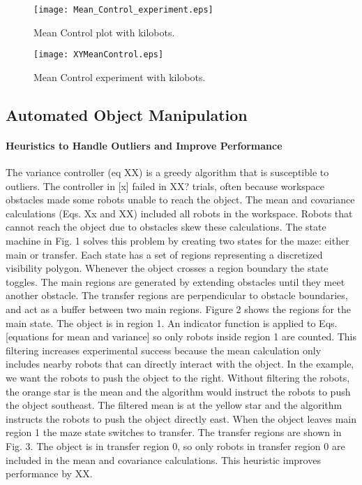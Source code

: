 \begin{figure}
\begin{center}
	\texttt{[image: Mean\_Control\_experiment.eps]}
\end{center}
\caption{\label{fig:realMean}
Mean Control plot with kilobots.
}
\end{figure}

\begin{figure}
\begin{center}
	\texttt{[image: XYMeanControl.eps]}
\end{center}
\caption{\label{fig:meanRobotFig}
Mean Control experiment with kilobots.
}
\end{figure}

\subsection{Automated Object Manipulation}
\paragraph{Heuristics to Handle Outliers and Improve Performance}

The variance controller (eq XX) is a greedy algorithm that is susceptible to outliers. The controller in [x] failed in XX? trials, often because workspace obstacles made some robots unable to reach the object. The mean and covariance calculations (Eqs. Xx and XX) included all robots in the workspace. Robots that cannot reach the object due to obstacles skew these calculations. The state machine in Fig. 1 solves this problem by creating two states for the maze: either main or transfer. Each state has a set of regions representing a discretized visibility polygon. Whenever the object crosses a region boundary the state toggles. The main regions are generated by extending obstacles until they meet another obstacle. The transfer regions are perpendicular to obstacle boundaries, and act as a buffer between two main regions.
Figure 2 shows the regions for the main state. The object is in region 1. An indicator function is applied to Eqs. [equations for mean and variance] so only robots inside region 1 are counted.  This filtering increases experimental success because the mean calculation only includes nearby robots that can directly interact with the object. In the example, we want the robots to push the object to the right. Without filtering the robots, the orange star is the mean and the algorithm would instruct the robots to push the object southeast. The filtered mean is at the yellow star and the algorithm instructs the robots to push the object directly east. 
When the object leaves main region 1 the maze state switches to transfer. The transfer regions are shown in Fig. 3.  The object is in transfer region 0, so only robots in transfer region 0 are included in the mean and covariance calculations.  
This heuristic improves performance by XX.

